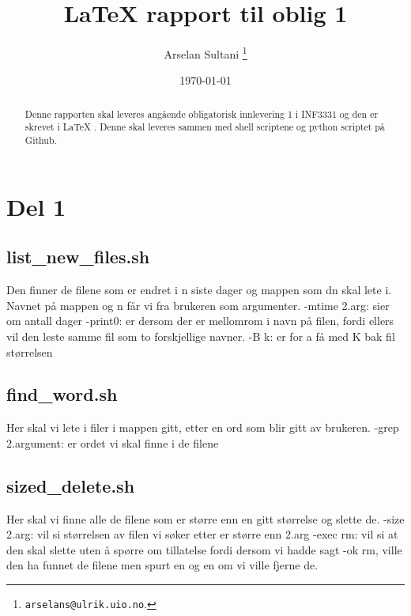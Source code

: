 \documentclass{article}
\begin{document}
\title{\LaTeX{} rapport til  oblig 1}

\author{
Arselan Sultani	\footnote{\texttt{arselans@ulrik.uio.no}.}
}

\date{\today}

\maketitle

\begin{abstract}
Denne rapporten skal leveres angående obligatorisk innlevering 1 i
INF3331 og den er skrevet i \LaTeX{} . Denne skal leveres sammen med 
shell scriptene og python scriptet på Github. 
\end{abstract}

\section{Del 1}
\label{sec:Del 1}

\subsection{list\_new\_files.sh}
\label{sec:1.1}
Den finner de filene som er endret i n siste dager og mappen som 
dn skal lete i. Navnet på mappen og n får vi fra brukeren som argumenter.
-mtime 2.arg: sier om antall dager 
-print0:  er dersom der er mellomrom i navn på filen, fordi ellers
vil den leste samme fil som to forskjellige navner.
-B k: er for a få med K bak fil størrelsen

\subsection{find\_word.sh}
\label{sec:1.2}
Her skal vi lete i filer i mappen gitt, etter en ord som blir 
gitt av brukeren.
-grep 2.argument: er ordet vi skal finne i de filene


\subsection{sized\_delete.sh}
\label{sec:1.3}
Her skal vi finne alle de filene som er større enn en gitt 
størrelse og slette de.
-size 2.arg: vil si størrelsen av filen vi søker etter er større enn 
2.arg
-exec rm: vil si at den skal slette uten å spørre om tillatelse fordi
dersom vi hadde sagt -ok rm, ville den ha funnet de filene men spurt 
en og en om vi ville fjerne de. 
\end{document}
